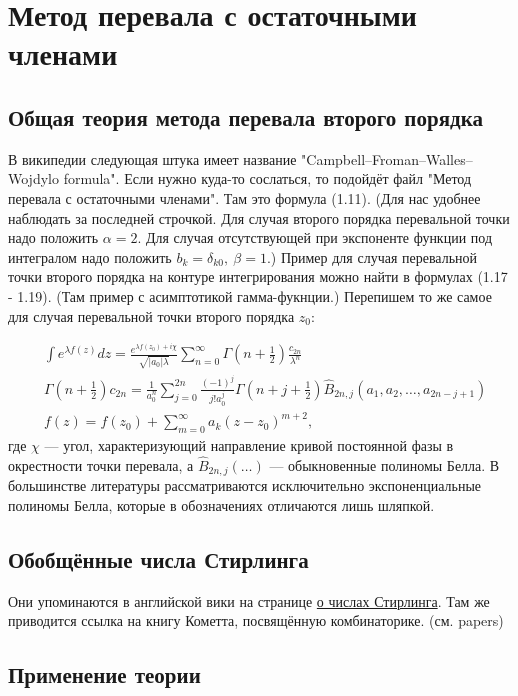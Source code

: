 \documentclass[a4paper, 12pt]{article}
\begin{document}
\section*{Метод перевала с остаточными членами}
\subsection*{Общая теория метода перевала второго порядка}
В википедии следующая штука имеет название "Campbell–Froman–Walles–Wojdylo formula". Если нужно куда-то сослаться, то подойдёт файл "Метод перевала с остаточными членами". Там это формула (1.11). (Для нас удобнее наблюдать за последней строчкой. Для случая второго порядка перевальной точки надо положить $\alpha=2$. Для случая отсутствующей при экспоненте функции под интегралом надо положить $b_k = \delta_{k0}, \: \beta = 1$.) Пример для случая перевальной точки второго порядка на контуре интегрирования можно найти в формулах (1.17 - 1.19). (Там пример с асимптотикой гамма-фукнции.) Перепишем то же самое для случая перевальной точки второго порядка $z_0$:

\begin{equation}
\begin{aligned}
    &\int e^{\lambda f(z)} dz = \frac{e^{\lambda f(z_0)+i\chi}}{\sqrt{|a_0|\lambda}}\sum\limits_{n=0}^{\infty} \Gamma\left(n+\frac{1}{2}\right)\frac{c_{2n}}{\lambda^n} \\ 
    & \Gamma\left(n+\frac{1}{2}\right) c_{2n}= \frac{1}{a_0^n}\sum\limits_{j=0}^{2n}\frac{(-1)^j}{j! a_0^j} \Gamma\left(n+j+\frac{1}{2}\right) \hat{B}_{2n, j}\left(a_1, a_2, \dots, a_{2n-j+1}\right) \\
    & f(z) = f(z_0) + \sum\limits_{m=0}^{\infty} a_k (z-z_0)^{m+2},
\end{aligned}
\end{equation}
где $\chi$ --- угол, характеризующий направление кривой постоянной фазы в окрестности точки перевала, а $\hat{B}_{2n, j}\left(\dots\right)$ --- обыкновенные полиномы Белла. В большинстве литературы рассматриваются исключительно экспоненциальные полиномы Белла, которые в обозначениях отличаются лишь шляпкой.
\subsection*{Обобщённые числа Стирлинга}
Они упоминаются в английской вики на странице \href{https://en.wikipedia.org/wiki/Stirling_numbers_of_the_second_kind}{о числах Стирлинга}. Там же приводится ссылка на книгу Кометта, посвящённую комбинаторике. (см. papers)
\subsection*{Применение теории}
\end{document}

